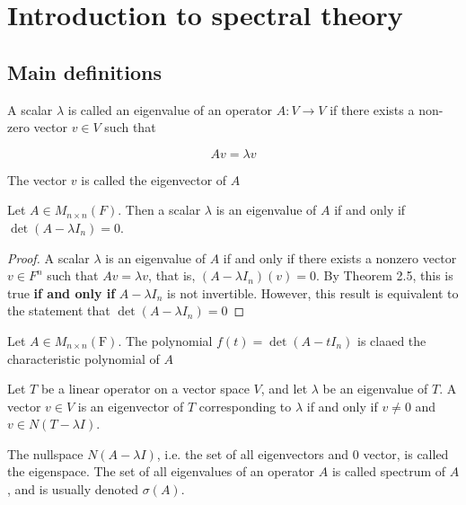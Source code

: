 


\cfoot{\thepage} %

\section{Introduction to spectral theory}

\subsection{Main definitions}

\begin{defn}
	A scalar $\lambda$ is called an eigenvalue of an operator $A:V \rightarrow V$ if there exists a non-zero vector $v \in V$ such that 
	
	$$Av = \lambda v$$
	
	The vector $v$ is called the eigenvector of $A$
\end{defn}

\begin{thm*}
	Let $A \in M_{n \times n}(F).$ Then a scalar $\lambda$ is an eigenvalue of $A$ if and only if $\det(A - \lambda I_{n}) = 0$.
\end{thm*}

\begin{proof}
	A scalar $\lambda$ is an eigenvalue of $A$ if and only if there exists a nonzero vector $v \in F^n$ such that $A v = \lambda v$, that is, $(A - \lambda I_n)(v) = 0$. By Theorem 2.5, this is true \textbf{if and only if} $A - \lambda I_n$ is not invertible. However, this result is equivalent to the statement that $\det(A - \lambda I_n)=0$
\end{proof}

\begin{defn}
	Let $A \in M_{n\times n}(\mathrm{F}).$ The polynomial $f(t) = \det (A - tI_n)$ is claaed the characteristic polynomial of $A$
\end{defn}

\begin{thm*}
	Let $T$ be a linear operator on a vector space $V$, and let $\lambda$ be an eigenvalue of $T$. A vector $v \in V$ is an eigenvector of $T$ corresponding to $\lambda$ if and only if $v \neq 0$ and $v \in N(T - \lambda I)$.
\end{thm*}

\begin{defn}
	The nullspace $N(A - \lambda I)$, i.e. the set of all eigenvectors and $0$ vector, is called the eigenspace. The set of all eigenvalues of an operator $A$ is called spectrum of $A$, and is usually denoted $\sigma (A)$.
\end{defn}

